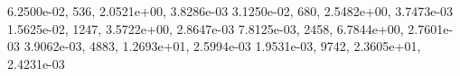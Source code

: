 6.2500e-02,   536, 2.0521e+00, 3.8286e-03 
3.1250e-02,   680, 2.5482e+00, 3.7473e-03 
1.5625e-02,  1247, 3.5722e+00, 2.8647e-03 
7.8125e-03,  2458, 6.7844e+00, 2.7601e-03 
3.9062e-03,  4883, 1.2693e+01, 2.5994e-03 
1.9531e-03,  9742, 2.3605e+01, 2.4231e-03 
